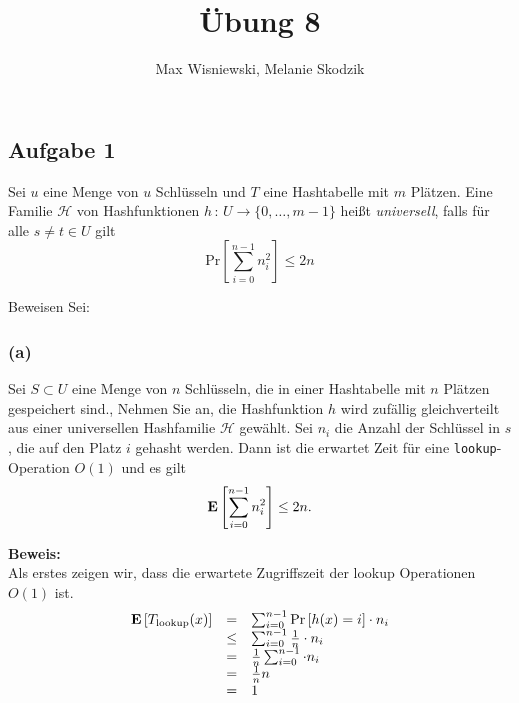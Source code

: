 \documentclass[11pt,a4paper,ngerman]{article}
\date{}
\title{Übung 8}
\author{Max Wisniewski, Melanie Skodzik}
\newcommand{\erw}[1]{\text{\bfseries E} \left[ #1 \right]}
\newcommand{\prob}[1]{\text{Pr}\left[ #1 \right]}
\begin{document}

\renewcommand{\figurename}{Grafik}

\maketitle
\thispagestyle{fancy}


\subsection*{Aufgabe 1}

Sei $u$ eine Menge von $u$ Schlüsseln und $T$ eine Hashtabelle mit $m$ Plätzen. Eine Familie $\mathcal{H}$ von Hashfunktionen $h \, : \, U \rightarrow \{0, \ldots, m-1\}$ heißt \emph{universell}, falls für alle $s \not= t \in U$ gilt
$$
	\prob{\sum_{i=0}^{n-1} n_i^2 } \leq 2n
$$

Beweisen Sei:

\subsubsection*{(a)}
Sei $S \subset U$ eine Menge von $n$ Schlüsseln, die in einer Hashtabelle mit $n$ Plätzen gespeichert sind., Nehmen Sie an, die Hashfunktion $h$ wird zufällig gleichverteilt aus einer universellen Hashfamilie $\mathcal{H}$ gewählt. Sei $n_i$ die Anzahl der Schlüssel in $s$, die auf den Platz $i$ gehasht werden. Dann ist die erwartet Zeit für eine \lstinline|lookup|-Operation $O(1)$ und es gilt
	$$
		\erw{\sum_{i=0}^{n-1} n_i^2} \leq 2n.
	$$

\noindent\textbf{Beweis:}\\
Als erstes zeigen wir, dass die erwartete Zugriffszeit der lookup Operationen $O(1)$ ist.\\

$$\begin{array}{rcl}
	\erw{T_\text{lookup}(x)} &=& \sum_{i=0}^{n-1} \prob{h(x)=i} \cdot n_i\\
					&\leq& \sum_{i=0}^{n-1} \frac{1}{n} \cdot n_i\\
					&=& \frac{1}{n} \sum_{i=0}^{n-1} \cdot n_i\\
					&=& \frac{1}{n} n\\
					&=& 1
\end{array}$$
\end{document}

